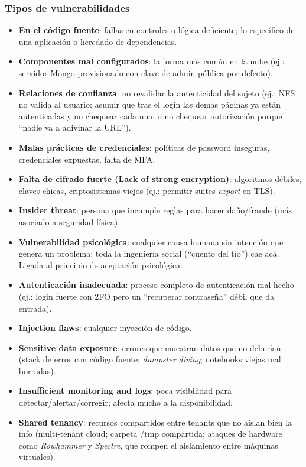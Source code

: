 \documentclass[../main.tex]{subfiles}
\begin{document}
\subsubsection{Tipos de vulnerabilidades}
\begin{itemize}
  \item \textbf{En el código fuente}: fallas en controles o lógica deficiente; lo específico de una aplicación o heredado de dependencias.
  \item \textbf{Componentes mal configurados}: la forma más común en la nube (ej.: servidor Mongo provisionado con clave de admin pública por defecto).
  \item \textbf{Relaciones de confianza}: no revalidar la autenticidad del sujeto (ej.: NFS no valida al usuario; asumir que tras el login las demás páginas ya están autenticadas y no chequear cada una; o no chequear autorización porque ``nadie va a adivinar la URL'').
  \item \textbf{Malas prácticas de credenciales}: políticas de password inseguras, credenciales expuestas, falta de MFA.
  \item \textbf{Falta de cifrado fuerte (Lack of strong encryption)}: algoritmos débiles, claves chicas, criptosistemas viejos (ej.: permitir suites \emph{export} en TLS).
  \item \textbf{Insider threat}: persona que incumple reglas para hacer daño/fraude (más asociado a seguridad física).
  \item \textbf{Vulnerabilidad psicológica}: cualquier causa humana sin intención que genera un problema; toda la ingeniería social (``cuento del tío'') cae acá. Ligada al principio de aceptación psicológica.
  \item \textbf{Autenticación inadecuada}: proceso completo de autenticación mal hecho (ej.: login fuerte con 2FO pero un ``recuperar contraseña'' débil que da entrada).
  \item \textbf{Injection flaws}: cualquier inyección de código. 
  \item \textbf{Sensitive data exposure}: errores que muestran datos que no deberían (stack de error con código fuente; \emph{dumpster diving}; notebooks viejas mal borradas).
  \item \textbf{Insufficient monitoring and logs}: poca visibilidad para detectar/alertar/corregir; afecta mucho a la disponibilidad.
  \item \textbf{Shared tenancy}: recursos compartidos entre tenants que no aíslan bien la info (multi-tenant cloud; carpeta /tmp compartida; ataques de hardware como \emph{Rowhammer} y \emph{Spectre}, que rompen el aislamiento entre máquinas virtuales).
\end{itemize}
\end{document}
